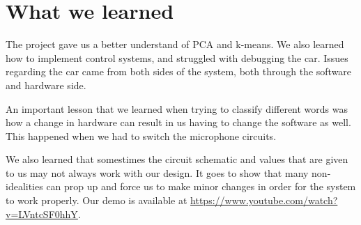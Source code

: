 \documentclass{article}
\begin{document}
\section*{What we learned}

The project gave us a better understand of PCA and k-means. We also learned how
to implement control systems, and struggled with debugging the car. Issues regarding
the car came from both sides of the system, both through the software and hardware side.

An important lesson that we learned when trying to classify different words 
was how a change in hardware can result in us having to change the software
as well. This happened when we had to switch the microphone circuits.

We also learned that somestimes the circuit schematic and values that are given
to us may not always work with our design. It goes to show that many 
non-idealities can prop up and force us to make minor changes in order
for the system to work properly.
Our demo is available at \url{https://www.youtube.com/watch?v=LVntcSF0hhY}.
\end{document}
